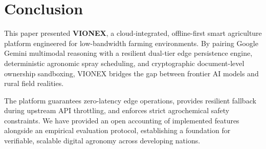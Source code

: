 \documentclass[conference]{IEEEtran}
\begin{document}
\section{Conclusion}
This paper presented \textbf{VIONEX}, a cloud-integrated, offline-first smart agriculture platform engineered for low-bandwidth farming environments. By pairing Google Gemini multimodal reasoning with a resilient dual-tier edge persistence engine, deterministic agronomic spray scheduling, and cryptographic document-level ownership sandboxing, VIONEX bridges the gap between frontier AI models and rural field realities. 

The platform guarantees zero-latency edge operations, provides resilient fallback during upstream API throttling, and enforces strict agrochemical safety constraints. We have provided an open accounting of implemented features alongside an empirical evaluation protocol, establishing a foundation for verifiable, scalable digital agronomy across developing nations.
\end{document}
